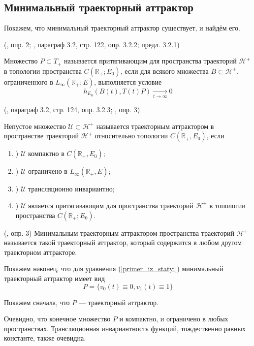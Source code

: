 \subsection*{Минимальный траекторный аттрактор}

Покажем, что минимальный траекторный аттрактор существует, и найдём его.

\opred (\cite{zhidkosti_s_pamyatyu}, опр. 2; \cite{Zelenaya}, параграф 3.2, стр. 122, опр. 3.2.2; предл. 3.2.1)

Множество $P \subset T_+$ называется притягивающим для пространства траекторий $\mathcal{H}^+$ в топологии пространства $C(\mathbb{R}_+; E_0)$,
если для всякого множества $B \subset \mathcal{H}^+$, ограниченного в $L_{\infty}(\mathbb{R}_+;E)$, выполняется условие
\begin{equation}
	h_{E_0}(B(t),T(t)P) \xrightarrow[t\to\infty]{}0
\end{equation}


\opred (\cite{Zelenaya}, параграф 3.2, стр. 124, опр. 3.2.3; \cite{zhidkosti_s_pamyatyu}, опр. 3)

Непустое множество $\mathcal{U}\subset\mathcal{H}^+$ называется траекторным аттрактором в пространстве траекторий $\mathcal{H}^+$ относительно топологии $C(\mathbb{R}_+,E_0)$, если
\begin{enumerate}
	\item)
		$\mathcal{U}$ компактно в $C(\mathbb{R}_+,E_0)$;
	\item)
		$\mathcal{U}$ ограничено в $L_{\infty}(\mathbb{R}_+,E)$;
	\item)
		$\mathcal{U}$ трансляционно инвариантно;
	\item)
		$\mathcal{U}$ является притягивающим для пространства траекторий $\mathcal{H}^+$ в топологии пространства $C(\mathbb{R}_+; E_0)$.
\end{enumerate}

\opred (\cite{zhidkosti_s_pamyatyu}, опр. 3)
Минимальным траекторным аттрактором пространства траекторий $\mathcal{H}^+$ называется такой траекторный аттрактор, который содержится в любом другом траекторном аттракторе.


Покажем наконец, что для уравнения (\ref{primer_iz_statyi}) минимальный траекторный аттрактор имеет вид
\begin{equation}
	P = \{ v_0(t) \equiv 0, v_1(t) \equiv 1\}
\end{equation}

Покажем сначала, что $P$ --- траекторный аттрактор.

Очевидно, что конечное множество $P$ и компактно, и ограничено в любых пространствах.
Трансляционная инвариантность функций, тождественно равных константе, также очевидна.

